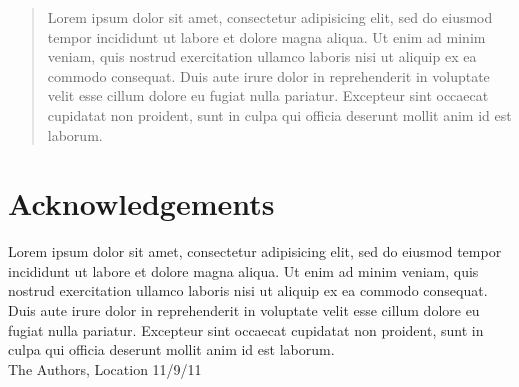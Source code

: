 \begin{abstract}
Lorem ipsum dolor sit amet, consectetur adipisicing elit, sed do eiusmod tempor incididunt ut labore et dolore magna aliqua. Ut enim ad minim veniam, quis nostrud exercitation ullamco laboris nisi ut aliquip ex ea commodo consequat. Duis aute irure dolor in reprehenderit in voluptate velit esse cillum dolore eu fugiat nulla pariatur. Excepteur sint occaecat cupidatat non proident, sunt in culpa qui officia deserunt mollit anim id est laborum.
\end{abstract}

\newpage
\clearpage
\mbox{}
\newpage
\clearpage
\thispagestyle{empty}
\section*{Acknowledgements}
Lorem ipsum dolor sit amet, consectetur adipisicing elit, sed do eiusmod tempor incididunt ut labore et dolore magna aliqua. Ut enim ad minim veniam, quis nostrud exercitation ullamco laboris nisi ut aliquip ex ea commodo consequat. Duis aute irure dolor in reprehenderit in voluptate velit esse cillum dolore eu fugiat nulla pariatur. Excepteur sint occaecat cupidatat non proident, sunt in culpa qui officia deserunt mollit anim id est laborum. \\[1cm]

\hfill The Authors, Location 11/9/11
\newpage
\clearpage
\mbox{}
